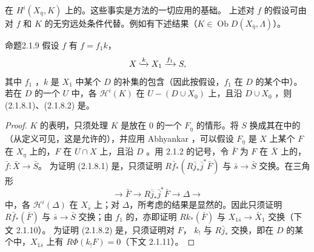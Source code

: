 在 $H^i(X_{\bar\eta},K)$ 上的。这些事实是方法的一切应用的基础。
上述对 $f$ 的假设可由对 $f$ 和 $K$ 的无穷远处条件代替。例如有下述结果（$K\in\operatorname{Ob}D(X_{\bar\eta},\Lambda)$）。
\begin{SGAresult}{命题}{2.1.9}
假设 $f$ 有 $f=f_1k$，
\[X\lhook\joinrel\xrightarrow{k}X_1\xrightarrow{f_1}S,\]
其中 $f_1$ ，$k$ 是 $X_1$ 中某个 $D$ 的补集的包含（因此按假设，$f_1$ 在 $D$ 的某个中）。若在 $D$ 的一个 $U$ 中，各 $\mathscr H^i(K)$ 在 $U-(D\cup X_0)$ 上，且沿 $D\cup X_0$ ，则 (2.1.8.1)、(2.1.8.2) 是。
\end{SGAresult}
\begin{proof}
$K$ 的表明，只须处理 $K$ 是放在 $0$ 的一个 $F_\eta$ 的情形。将 $S$ 换成其在中的（从定义可见，这是允许的），并应用 Abhyankar ，可以假设 $F_\eta$ 是 $X$ 上某个 $F$ 在 $X_\eta$ 上的，$F$ 在 $U\cap X$ 上，且沿 $D$ 。用 2.1.2 的记号，令 $\bar F$ 为 $F$ 在 $\bar X$ 上的，$\bar f:\bar X\to\bar S$。
为证明 (2.1.8.1) 是，只须证明 $R\bar f_*(R\bar j_*\bar j^*\bar F)$ 与 $\bar s\to\bar S$ 交换。在三角形
\[\longrightarrow\bar F\longrightarrow R\bar j_*\bar j^*\bar F\longrightarrow\Delta\longrightarrow\]
中，各 $\mathscr H^i(\Delta)$ 在 $X_{\bar s}$ 上；对 $\Delta$，所考虑的结果是显然的。因此只须证明 $R\bar f_*(\bar F)$ 与 $\bar s\to\bar S$ 交换；由 $f_1$ 的，亦即证明
$Rk_*(\bar F)$ 与 $X_{1\bar s}\to\bar X_1$ 交换（下文 2.1.10）。
为证明 (2.1.8.2) 是，只须证明对 $F$， $k_!$ 与 $R\bar j_*$ 交换，即在 $D$ 的某个中，$X_{1\bar s}$ 上有 $R\Phi(k_!F)=0$（下文 2.1.11）。
\end{proof}
